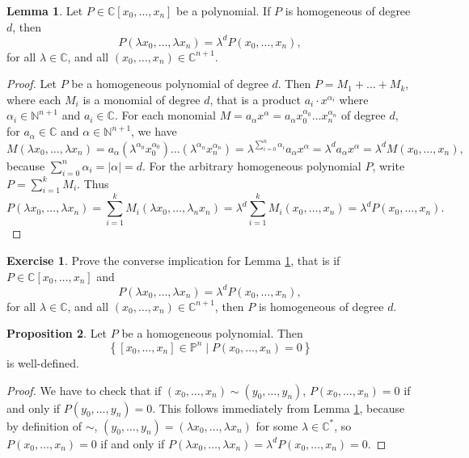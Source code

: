 \documentclass{article}
\newcommand{\N}{\mathbb{N}}
\newcommand{\C}{\mathbb{C}}
\renewcommand{\P}{\mathbb{P}}
\newcommand{\rb}[1]{\left( #1 \right)}
\renewcommand{\sb}[1]{\left[ #1 \right]}
\newcommand{\cb}[1]{\left\{ #1 \right\}}
\newcommand{\abs}[1]{\left\lvert #1 \right\rvert}
\theoremstyle{definition}\newtheorem{definition}{Definition}[section]
\theoremstyle{definition}\newtheorem{notation}[definition]{Notation}
\theoremstyle{definition}\newtheorem{remark}[definition]{Remark}
\theoremstyle{definition}\newtheorem{example}[definition]{Example}
\theoremstyle{definition}\newtheorem{fact}{Fact}
\theoremstyle{definition}\newtheorem{exercise}{Exercise}
\newtheorem{proposition}[definition]{Proposition}
\newtheorem{lemma}[definition]{Lemma}
\begin{document}
\begin{lemma}
\label{lem:4.4}
Let $ P \in \C\sb{x_0, \dots, x_n} $ be a polynomial. If $ P $ is homogeneous of degree $ d $, then
$$ P\rb{\lambda x_0, \dots, \lambda x_n} = \lambda^dP\rb{x_0, \dots, x_n}, $$ for all $ \lambda \in \C $, and all $ \rb{x_0, \dots, x_n} \in \C^{n + 1} $.
\end{lemma}

\begin{proof}
Let $ P $ be a homogeneous polynomial of degree $ d $. Then $ P = M_1 + \dots + M_k $, where each $ M_i $ is a monomial of degree $ d $, that is a product $ a_i \cdot x^{\alpha_i} $ where $ \alpha_i \in \N^{n + 1} $ and $ a_i \in \C $. For each monomial $ M = a_\alpha x^\alpha = a_\alpha x_0^{\alpha_0} \dots x_n^{\alpha_n} $ of degree $ d $, for $ a_\alpha \in \C $ and $ \alpha \in \N^{n + 1} $, we have
$$ M\rb{\lambda x_0, \dots, \lambda x_n} = a_\alpha\rb{\lambda^{\alpha_0}x_0^{\alpha_0}} \dots \rb{\lambda^{\alpha_n}x_n^{\alpha_n}} = \lambda^{\sum_{i = 0}^n \alpha_i}a_\alpha x^\alpha = \lambda^da_\alpha x^\alpha = \lambda^dM\rb{x_0, \dots, x_n}, $$
because $ \sum_{i = 0}^n \alpha_i = \abs{\alpha} = d $. For the arbitrary homogeneous polynomial $ P $, write $ P = \sum_{i = 1}^k M_i $. Thus
$$ P\rb{\lambda x_0, \dots, \lambda x_n} = \sum_{i = 1}^k M_i\rb{\lambda x_0, \dots, \lambda_n x_n} = \lambda^d\sum_{i = 1}^k M_i\rb{x_0, \dots, x_n} = \lambda^dP\rb{x_0, \dots, x_n}. $$
\end{proof}

\begin{exercise}
Prove the converse implication for Lemma \ref{lem:4.4}, that is if $ P \in \C\sb{x_0, \dots, x_n} $ and
$$ P\rb{\lambda x_0, \dots, \lambda x_n} = \lambda^dP\rb{x_0, \dots, x_n}, $$
for all $ \lambda \in \C $, and all $ \rb{x_0, \dots, x_n} \in \C^{n + 1} $, then $ P $ is homogeneous of degree $ d $.
\end{exercise}

\begin{proposition}
Let $ P $ be a homogeneous polynomial. Then
$$ \cb{\sb{x_0, \dots, x_n} \in \P^n \mid P\rb{x_0, \dots, x_n} = 0} $$
is well-defined.
\end{proposition}

\begin{proof}
We have to check that if $ \rb{x_0, \dots, x_n} \sim \rb{y_0, \dots, y_n} $, $ P\rb{x_0, \dots, x_n} = 0 $ if and only if $ P\rb{y_0, \dots, y_n} = 0 $. This follows immediately from Lemma \ref{lem:4.4}, because by definition of $ \sim $, $ \rb{y_0, \dots, y_n} = \rb{\lambda x_0, \dots, \lambda x_n} $ for some $ \lambda \in \C^* $, so $ P\rb{x_0, \dots, x_n} = 0 $ if and only if $ P\rb{\lambda x_0, \dots, \lambda x_n} = \lambda^dP\rb{x_0, \dots, x_n} = 0 $.
\end{proof}
\end{document}
